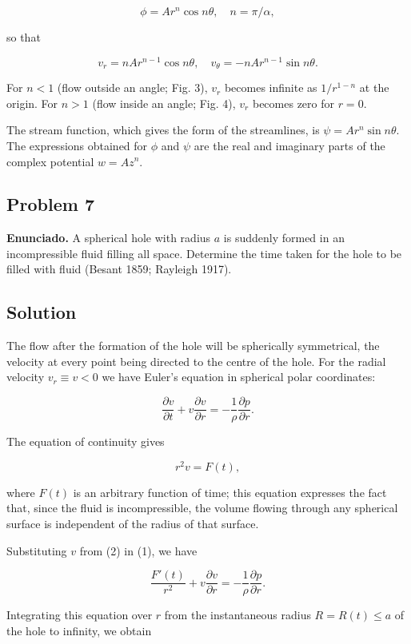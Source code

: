 \documentclass{article}
\begin{document}
$$
\phi = Ar^n \cos n\theta, \quad n = \pi/\alpha,
$$

so that

$$
v_r = nAr^{n-1} \cos n\theta, \quad v_\theta = -nAr^{n-1} \sin n\theta.
$$

For $n < 1$ (flow outside an angle; Fig. 3), $v_r$ becomes infinite as $1/r^{1-n}$ at the origin. For $n > 1$ (flow inside an angle; Fig. 4), $v_r$ becomes zero for $r = 0$.

The stream function, which gives the form of the streamlines, is $\psi = Ar^n \sin n\theta$. The expressions obtained for $\phi$ and $\psi$ are the real and imaginary parts of the complex potential $w = Az^n$.

\subsection*{Problem 7}

\textbf{Enunciado.} A spherical hole with radius $a$ is suddenly formed in an incompressible fluid filling all space. Determine the time taken for the hole to be filled with fluid (Besant 1859; Rayleigh 1917).

\subsection*{Solution}

The flow after the formation of the hole will be spherically symmetrical, the velocity at every point being directed to the centre of the hole. For the radial velocity $v_r \equiv v < 0$ we have Euler's equation in spherical polar coordinates:

$$
\frac{\partial v}{\partial t} + v \frac{\partial v}{\partial r} = -\frac{1}{\rho} \frac{\partial p}{\partial r}. \tag{1}
$$

The equation of continuity gives

$$
r^2 v = F(t), \tag{2}
$$

where $F(t)$ is an arbitrary function of time; this equation expresses the fact that, since the fluid is incompressible, the volume flowing through any spherical surface is independent of the radius of that surface.

Substituting $v$ from (2) in (1), we have

$$
\frac{F'(t)}{r^2} + v \frac{\partial v}{\partial r} = -\frac{1}{\rho} \frac{\partial p}{\partial r}.
$$

Integrating this equation over $r$ from the instantaneous radius $R = R(t) \leq a$ of the hole to infinity, we obtain
\end{document}
